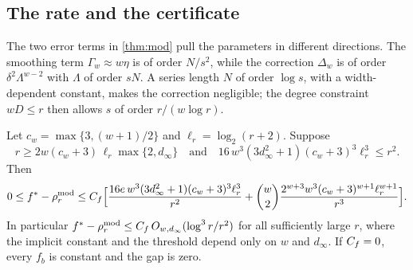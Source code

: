 \subsection{The rate and the certificate}\label{sec:mod-rate}

The two error terms in \cref{thm:mod} pull the parameters in different
directions. The smoothing term $\Gamma_w\approx w\eta$ is of order
$N/s^2$, while the correction $\Delta_w$ is of order
$\delta^2\Lambda^{w-2}$ with $\Lambda$ of order $sN$. A series length
$N$ of order $\log s$, with a width-dependent constant, makes the
correction negligible; the degree constraint $wD\le r$ then allows $s$ of
order $r/(w\log r)$.

\begin{corollary}\label{cor:mod-rate}
Let $c_w=\max\{3,(w+1)/2\}$ and $\ell_r=\log_2(r+2)$. Suppose
\begin{equation}\label{eq:mod-threshold}
  r\ge2w(c_w+3)\,\ell_r\max\{2,d_\infty\}
  \quad\text{and}\quad
  16\,w^3(3d_\infty^2+1)(c_w+3)^3\ell_r^3\le r^2 .
\end{equation}
Then
\begin{equation}\label{eq:mod-rate}
  0\le f^{*}-\rho^{\mathrm{mod}}_r\le C_f\Bigl[
  \frac{16e\,w^3(3d_\infty^2+1)(c_w+3)^3\ell_r^3}{r^2}
  +\binom w2\frac{2^{w+3}w^3(c_w+3)^{w+1}\ell_r^{w+1}}{r^3}\Bigr].
\end{equation}
In particular $f^{*}-\rho^{\mathrm{mod}}_r\le C_f\,O_{w,d_\infty}(\log^3r/r^2)$ for all
sufficiently large $r$, where the implicit constant and the threshold
depend only on $w$ and $d_\infty$. If $C_f=0$, every $f_b$ is constant and
the gap is zero.
\end{corollary}


